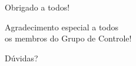 \begin{frame}

\centering
\Large

Obrigado a todos!

\vspace{24pt}

Agradecimento especial a todos\\os membros do Grupo de Controle!

\vspace{24pt}

Dúvidas?

\end{frame}